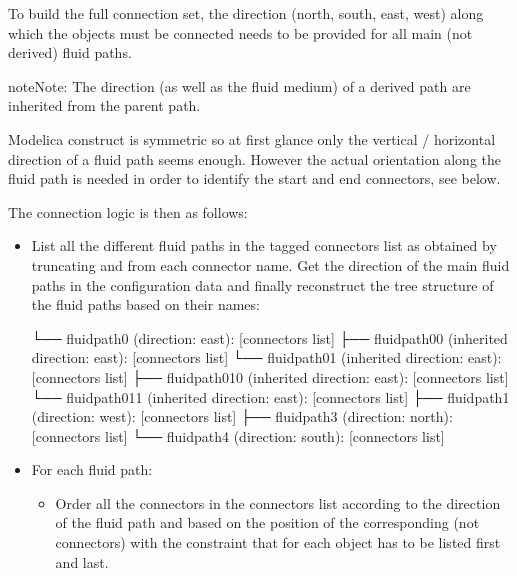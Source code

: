 \documentclass[letterpaper,10pt, openany,english]{sphinxmanual}
\begin{document}
To build the full connection set, the direction (north, south, east, west) along which the objects must be connected needs to be provided for all main (not derived) fluid paths.

\begin{sphinxadmonition}{note}{Note:}
The direction (as well as the fluid medium) of a derived path are inherited from the parent path.

Modelica  construct is symmetric so at first glance only the vertical / horizontal direction of a fluid path seems enough. However the actual orientation along the fluid path is needed in order to identify the start and end connectors, see below.
\end{sphinxadmonition}

The connection logic is then as follows:
\begin{itemize}
\item {} 
List all the different fluid paths in the tagged connectors list as obtained by truncating  and  from each connector name. Get the direction of the main fluid paths in the configuration data and finally reconstruct the tree structure of the fluid paths based on their names:

\begin{sphinxVerbatim}[commandchars=\\\{\}]
└── fluid\PYGZus{}path0 (direction: east): [connectors list]
  ├── fluid\PYGZus{}path0\PYGZus{}0 (inherited direction: east): [connectors list]
  └── fluid\PYGZus{}path0\PYGZus{}1 (inherited direction: east): [connectors list]
    ├── fluid\PYGZus{}path0\PYGZus{}1\PYGZus{}0 (inherited direction: east): [connectors list]
    └── fluid\PYGZus{}path0\PYGZus{}1\PYGZus{}1 (inherited direction: east): [connectors list]
├── fluid\PYGZus{}path1 (direction: west): [connectors list]
├── fluid\PYGZus{}path3 (direction: north): [connectors list]
└── fluid\PYGZus{}path4 (direction: south): [connectors list]
\end{sphinxVerbatim}

\item {} 
For each fluid path:
\begin{itemize}
\item {} 
Order all the connectors in the connectors list according to the direction of the fluid path and based on the position of the corresponding  (not connectors) with the constraint that for each object  has to be listed first and  last.


\end{itemize}
\end{itemize}
\end{document}
